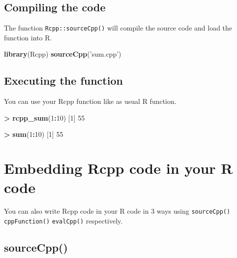 \documentclass[]{book}
\newenvironment{Shaded}{\begin{snugshade}}{\end{snugshade}}
\newcommand{\DecValTok}[1]{\textcolor[rgb]{0.00,0.00,0.81}{#1}}
\newcommand{\KeywordTok}[1]{\textcolor[rgb]{0.13,0.29,0.53}{\textbf{#1}}}
\newcommand{\NormalTok}[1]{#1}
\newcommand{\OperatorTok}[1]{\textcolor[rgb]{0.81,0.36,0.00}{\textbf{#1}}}
\newcommand{\StringTok}[1]{\textcolor[rgb]{0.31,0.60,0.02}{#1}}
\begin{document}
\hypertarget{compiling-the-code}{%
\section{Compiling the code}\label{compiling-the-code}}

The function \texttt{Rcpp::sourceCpp()} will compile the source code and load the function into R.

\begin{Shaded}
\begin{Highlighting}[]
\KeywordTok{library}\NormalTok{(Rcpp)}
\KeywordTok{sourceCpp}\NormalTok{(}\StringTok{'sum.cpp'}\NormalTok{)}
\end{Highlighting}
\end{Shaded}

\hypertarget{executing-the-function}{%
\section{Executing the function}\label{executing-the-function}}

You can use your Rcpp function like as usual R function.

\begin{Shaded}
\begin{Highlighting}[]
\OperatorTok{>}\StringTok{ }\KeywordTok{rcpp_sum}\NormalTok{(}\DecValTok{1}\OperatorTok{:}\DecValTok{10}\NormalTok{)}
\NormalTok{[}\DecValTok{1}\NormalTok{] }\DecValTok{55}

\OperatorTok{>}\StringTok{ }\KeywordTok{sum}\NormalTok{(}\DecValTok{1}\OperatorTok{:}\DecValTok{10}\NormalTok{)}
\NormalTok{[}\DecValTok{1}\NormalTok{] }\DecValTok{55}
\end{Highlighting}
\end{Shaded}

\hypertarget{embedding-rcpp-code-in-your-r-code}{%
\chapter{Embedding Rcpp code in your R code}\label{embedding-rcpp-code-in-your-r-code}}

You can also write Rcpp code in your R code in 3 ways using \texttt{sourceCpp()} \texttt{cppFunction()} \texttt{evalCpp()} respectively.

\hypertarget{sourcecpp}{%
\section{sourceCpp()}\label{sourcecpp}}
\end{document}

